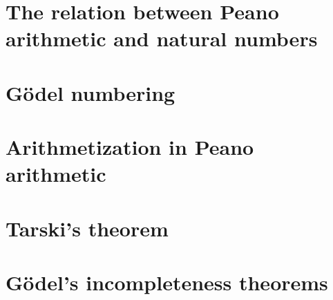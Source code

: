 \documentclass[11pt,a4paper]{article}
\begin{document}
\section{The relation between Peano arithmetic and natural numbers}

\section{Gödel numbering}

\section{Arithmetization in Peano arithmetic}

\section{Tarski's theorem}

\section{Gödel's incompleteness theorems}

{\raggedright%
\printbibliography[heading=bibintoc]%
}
\end{document}
